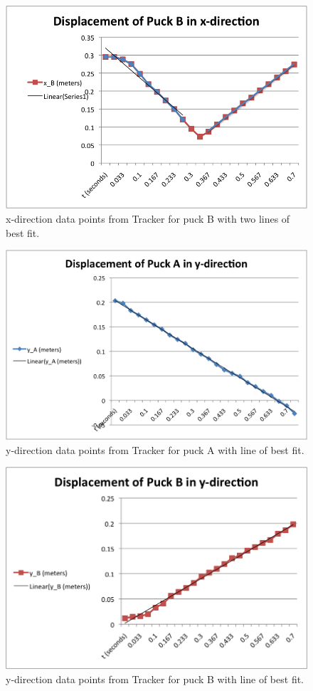\documentclass[11pt]{article}
\begin{document}
\begin{figure}[!h]
     \includegraphics{x_B.png}
     \caption{x-direction data points from Tracker for puck B with two lines of best fit.}
     \label{xB}
\end{figure}

\begin{figure}[!h]
     \includegraphics{y_A.png}
     \caption{y-direction data points from Tracker for puck A with line of best fit.}
     \label{yA}
\end{figure}

\begin{figure}[!h]
     \includegraphics{y_B.png}
     \caption{y-direction data points from Tracker for puck B with line of best fit.}
     \label{yB}
\end{figure}
\end{document}
